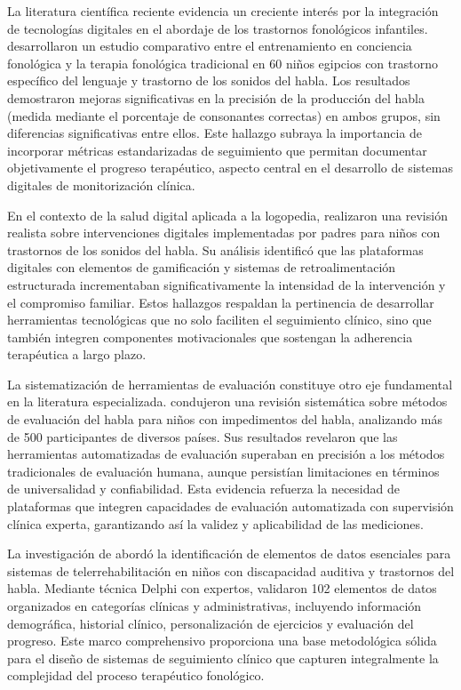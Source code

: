 \documentclass[12pt, oneside]{article}
\begin{document}
La literatura científica reciente evidencia un creciente interés por la integración de tecnologías digitales en el abordaje de los trastornos fonológicos infantiles. \textcite{Farag2024} desarrollaron un estudio comparativo entre el entrenamiento en conciencia fonológica y la terapia fonológica tradicional en 60 niños egipcios con trastorno específico del lenguaje y trastorno de los sonidos del habla. Los resultados demostraron mejoras significativas en la precisión de la producción del habla (medida mediante el porcentaje de consonantes correctas) en ambos grupos, sin diferencias significativas entre ellos. Este hallazgo subraya la importancia de incorporar métricas estandarizadas de seguimiento que permitan documentar objetivamente el progreso terapéutico, aspecto central en el desarrollo de sistemas digitales de monitorización clínica.

En el contexto de la salud digital aplicada a la logopedia, \textcite{Leafe2025} realizaron una revisión realista sobre intervenciones digitales implementadas por padres para niños con trastornos de los sonidos del habla. Su análisis identificó que las plataformas digitales con elementos de gamificación y sistemas de retroalimentación estructurada incrementaban significativamente la intensidad de la intervención y el compromiso familiar. Estos hallazgos respaldan la pertinencia de desarrollar herramientas tecnológicas que no solo faciliten el seguimiento clínico, sino que también integren componentes motivacionales que sostengan la adherencia terapéutica a largo plazo.

La sistematización de herramientas de evaluación constituye otro eje fundamental en la literatura especializada. \textcite{Usha2023} condujeron una revisión sistemática sobre métodos de evaluación del habla para niños con impedimentos del habla, analizando más de 500 participantes de diversos países. Sus resultados revelaron que las herramientas automatizadas de evaluación superaban en precisión a los métodos tradicionales de evaluación humana, aunque persistían limitaciones en términos de universalidad y confiabilidad. Esta evidencia refuerza la necesidad de plataformas que integren capacidades de evaluación automatizada con supervisión clínica experta, garantizando así la validez y aplicabilidad de las mediciones.

La investigación de \textcite{Ebrahimi2024} abordó la identificación de elementos de datos esenciales para sistemas de telerrehabilitación en niños con discapacidad auditiva y trastornos del habla. Mediante técnica Delphi con expertos, validaron 102 elementos de datos organizados en categorías clínicas y administrativas, incluyendo información demográfica, historial clínico, personalización de ejercicios y evaluación del progreso. Este marco comprehensivo proporciona una base metodológica sólida para el diseño de sistemas de seguimiento clínico que capturen integralmente la complejidad del proceso terapéutico fonológico.
\end{document}
